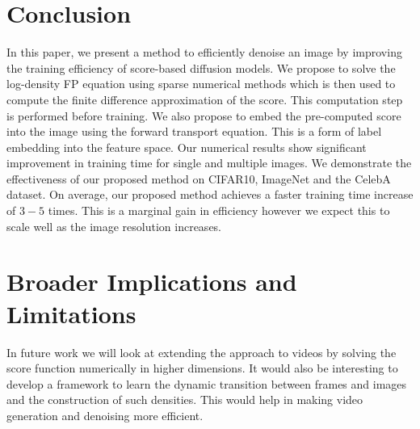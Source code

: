 \documentclass[]{interact}
\theoremstyle{plain}%
\theoremstyle{definition}
\theoremstyle{remark}
\begin{document}
\section{Conclusion}
In this paper, we present a method to efficiently denoise an image by improving the training efficiency of score-based diffusion models. We propose to solve the log-density FP equation using sparse numerical methods which is then used to compute the finite difference approximation of the score. This computation step is performed before training. We also propose to embed the pre-computed score into the image using the forward transport equation. This is a form of label embedding into the feature space. Our numerical results show significant improvement in training time for single and multiple images. We demonstrate the effectiveness of our proposed method on CIFAR10, ImageNet and the CelebA dataset. On average, our proposed method achieves a faster training time increase of $3 - 5$ times. This is a marginal gain in efficiency however we expect this to scale well as the image resolution increases.

\section{Broader Implications and Limitations}
In future work we will look at extending the approach to videos by solving the score function numerically in higher dimensions. It would also be interesting to develop a framework to learn the dynamic transition between frames and images and the construction of such densities. This would help in making video generation and denoising more efficient. 



\end{document}
